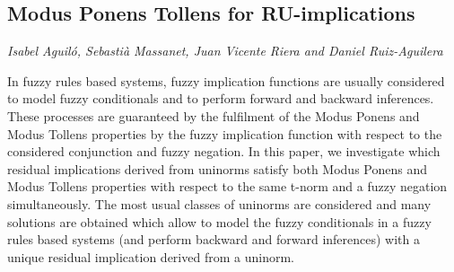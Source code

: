 \documentclass[../booklet.tex]{subfiles}
\begin{document}
\subsection[Modus Ponens Tollens for RU-implications. {\it Isabel Aguiló, Sebastià Massanet, Juan Vicente Riera and Daniel Ruiz-Aguilera}]{Modus Ponens Tollens for RU-implications}
   

\begin{center}
  {\it Isabel Aguiló, Sebastià Massanet, Juan Vicente Riera and Daniel Ruiz-Aguilera}
\end{center}



In fuzzy rules based systems, fuzzy implication functions are usually considered to model fuzzy conditionals and to perform forward and backward inferences. These processes are guaranteed by the fulfilment of the Modus Ponens and Modus Tollens properties by the fuzzy implication function with respect to the considered conjunction and fuzzy negation. In this paper, we investigate which residual implications derived from uninorms satisfy both Modus Ponens and Modus Tollens properties with respect to the same t-norm and a fuzzy negation simultaneously. The most usual classes of uninorms are considered and many solutions are obtained which allow to model the fuzzy conditionals in a fuzzy rules based systems (and perform backward and forward inferences) with a unique residual implication derived from a uninorm.  
\end{document}
